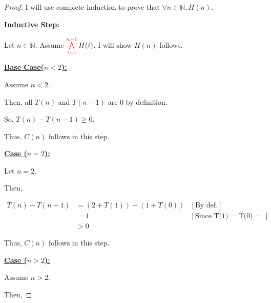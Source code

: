 \documentclass[12pt]{article}
\begin{document}
\begin{itemize}
\begin{mdframed}
\begin{proof}
        \bigskip

        I will use complete induction to prove that $\forall n \in \mathbb{N}, H(n)$.

        \bigskip

        \underline{\textbf{Inductive Step:}}

        \bigskip

        Let $n \in \mathbb{N}$. Assume $\color{red}\bigwedge\limits_{i=1}^{n-1}\color{black}H(i)$. I will
        show $H(n)$ follows.

        \bigskip

        \underline{\textbf{Base Case($n < 2$):}}

        \bigskip

        Assume $n < 2$.

        \bigskip

        Then, all $T(n)$ and $T(n-1)$ are 0 by definition.

        \bigskip

        So, $T(n) - T(n-1) \geq 0$.

        \bigskip

        Thus, $C(n)$ follows in this step.

        \bigskip

        \color{red}
        \underline{\textbf{Case ($n = 2$):}}

        \bigskip

        Let $n = 2$.

        \bigskip

        Then,

        \begin{align}
            T(n) - T(n-1) &= (2 + T(1)) - (1 + T(0)) & [\text{By def.}]\\
            &= 1 & [\text{Since T(1) = T(0) = 0 by def.}]\\
            &> 0
        \end{align}

        \bigskip

        Thus, $C(n)$ follows in this step.

        \color{black}
        \bigskip

        \underline{\textbf{Case (\color{red}$n > 2$\color{black}):}}

        \bigskip

        Assume \color{red}$n > 2$\color{black}.

        \bigskip

        Then,


\end{proof}
\end{mdframed}
\end{itemize}
\end{document}
